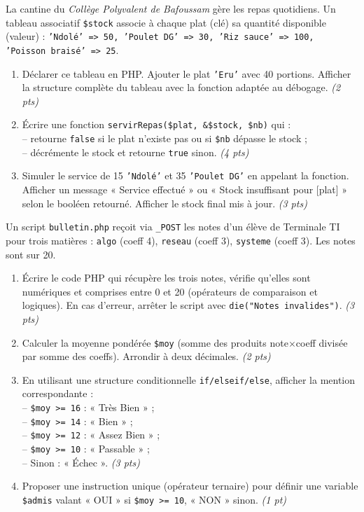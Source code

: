 \documentclass[11pt]{article}
\begin{document}
\begin{exercice}
La cantine du \textit{Collège Polyvalent de Bafoussam} gère les repas quotidiens. Un tableau associatif \texttt{\$stock} associe à chaque plat (clé) sa quantité disponible (valeur) : \texttt{'Ndolé' => 50, 'Poulet DG' => 30, 'Riz sauce' => 100, 'Poisson braisé' => 25}.
\begin{enumerate}
    \item Déclarer ce tableau en PHP. Ajouter le plat \texttt{'Eru'} avec 40 portions. Afficher la structure complète du tableau avec la fonction adaptée au débogage. \textit{(2 pts)}
    \item Écrire une fonction \texttt{servirRepas(\$plat, \&\$stock, \$nb)} qui :\\
    -- retourne \texttt{false} si le plat n'existe pas ou si \texttt{\$nb} dépasse le stock ;\\
    -- décrémente le stock et retourne \texttt{true} sinon. \textit{(4 pts)}
    \item Simuler le service de 15 \texttt{'Ndolé'} et 35 \texttt{'Poulet DG'} en appelant la fonction. Afficher un message « Service effectué » ou « Stock insuffisant pour [plat] » selon le booléen retourné. Afficher le stock final mis à jour. \textit{(3 pts)}
\end{enumerate}
\end{exercice}

\begin{exercice}
Un script \texttt{bulletin.php} reçoit via \texttt{\_POST} les notes d'un élève de Terminale TI pour trois matières : \texttt{algo} (coeff 4), \texttt{reseau} (coeff 3), \texttt{systeme} (coeff 3). Les notes sont sur 20.
\begin{enumerate}
    \item Écrire le code PHP qui récupère les trois notes, vérifie qu'elles sont numériques et comprises entre 0 et 20 (opérateurs de comparaison et logiques). En cas d'erreur, arrêter le script avec \texttt{die("Notes invalides")}. \textit{(3 pts)}
    \item Calculer la moyenne pondérée \texttt{\$moy} (somme des produits note$\times$coeff divisée par somme des coeffs). Arrondir à deux décimales. \textit{(2 pts)}
    \item En utilisant une structure conditionnelle \texttt{if/elseif/else}, afficher la mention correspondante :\\
    -- \texttt{\$moy >= 16} : « Très Bien » ;\\
    -- \texttt{\$moy >= 14} : « Bien » ;\\
    -- \texttt{\$moy >= 12} : « Assez Bien » ;\\
    -- \texttt{\$moy >= 10} : « Passable » ;\\
    -- Sinon : « Échec ». \textit{(3 pts)}
    \item Proposer une instruction unique (opérateur ternaire) pour définir une variable \texttt{\$admis} valant « OUI » si \texttt{\$moy >= 10}, « NON » sinon. \textit{(1 pt)}
\end{enumerate}
\end{exercice}
\end{document}

